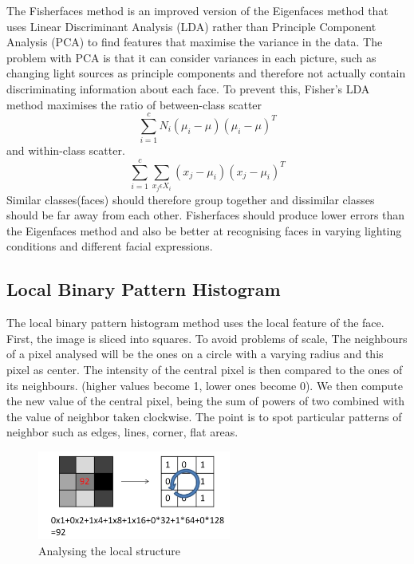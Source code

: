 The Fisherfaces method is an improved version of the Eigenfaces method that uses Linear Discriminant Analysis (LDA) rather than Principle Component Analysis (PCA) to find features that maximise the variance in the data. The problem with PCA is that it can consider variances in each picture, such as changing light sources as principle components and therefore not actually contain discriminating information about each face. To prevent this, Fisher's LDA method maximises the ratio of between-class scatter 
\begin{equation}
	\sum\limits_{i=1}^{c}N_{i}(\mu_{i}-\mu)(\mu_{i}-\mu)^T
\end{equation}
and within-class scatter.
\begin{equation}
	\sum\limits_{i=1}^{c}\sum\limits_{x_{j}\epsilon X_{i}}^{}(x_{j}-\mu_{i})(x_{j}-\mu_{i})^T
\end{equation}
Similar classes(faces) should therefore group together and dissimilar classes should be far away from each other.
Fisherfaces should produce lower errors than the Eigenfaces method and also be better at recognising faces in varying lighting conditions and different facial expressions.

\subsection{Local Binary Pattern Histogram}

The local binary pattern histogram method uses the local feature of the face. First, the image is sliced into squares.
To avoid problems of scale, The neighbours of a pixel analysed will be the ones on a circle with a varying radius and this pixel as center.
The intensity of the central pixel is then compared to the ones of its neighbours. (higher values become 1, lower ones become 0).
We then compute the new value of the central pixel, being the sum of powers of two combined with the value of neighbor taken clockwise. The point is to spot particular patterns of neighbor such as edges, lines, corner, flat areas.

\begin{figure}[ht]
\centering
\includegraphics[width=2.5in]{rsrc/LBPH1.jpg}
\caption{Analysing the local structure}
\label{Local Structure}
\end{figure}

